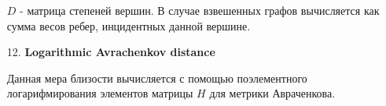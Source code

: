 \begin{itemize}
$D$ - матрица степеней вершин. В случае взвешенных графов вычисляется как сумма весов ребер, инцидентных данной вершине.


\item[12.] \textbf{Logarithmic Avrachenkov distance}

Данная мера близости вычисляется с помощью поэлементного логарифмирования элементов матрицы $H$ для метрики Авраченкова. 

\end{itemize}


\clearpage
